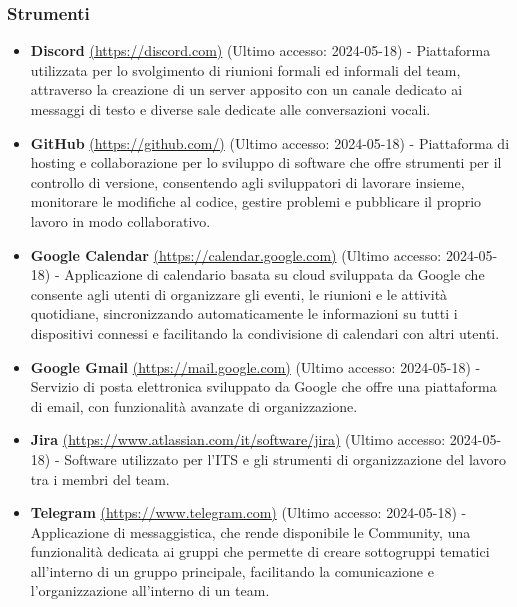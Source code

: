 \subsubsection{Strumenti}
\begin{itemize}
    \item \textbf{Discord} \href{https://discord.com}{(https://discord.com)} (Ultimo accesso: 2024-05-18) - Piattaforma utilizzata per lo svolgimento di riunioni formali ed informali del team, attraverso la creazione di un server apposito con un canale dedicato ai messaggi di testo e diverse sale dedicate alle conversazioni vocali.
    
    \item \textbf{GitHub} \href{https://github.com/}{(https://github.com/)} (Ultimo accesso: 2024-05-18) - Piattaforma di hosting e collaborazione per lo sviluppo di software che offre strumenti per il controllo di versione, consentendo agli sviluppatori di lavorare insieme, monitorare le modifiche al codice, gestire problemi e pubblicare il proprio lavoro in modo collaborativo.
    
    \item \textbf{Google Calendar} \href{https://calendar.google.com}{(https://calendar.google.com)} (Ultimo accesso: 2024-05-18) - Applicazione di calendario basata su cloud sviluppata da Google che consente agli utenti di organizzare gli eventi, le riunioni e le attività quotidiane, sincronizzando automaticamente le informazioni su tutti i dispositivi connessi e facilitando la condivisione di calendari con altri utenti.
    
    \item \textbf{Google Gmail} \href{https://mail.google.com}{(https://mail.google.com)} (Ultimo accesso: 2024-05-18) - Servizio di posta elettronica sviluppato da Google che offre una piattaforma di email, con funzionalità avanzate di organizzazione.
    
    \item \textbf{Jira} \href{https://www.atlassian.com/it/software/jira}{(https://www.atlassian.com/it/software/jira)} (Ultimo accesso: 2024-05-18) - Software utilizzato per l'ITS e gli strumenti di organizzazione del lavoro tra i membri del team.
    
    \item \textbf{Telegram} \href{https://www.telegram.com}{(https://www.telegram.com)} (Ultimo accesso: 2024-05-18) - Applicazione di messaggistica, che rende disponibile le Community, una funzionalità dedicata ai gruppi che permette di creare sottogruppi tematici all'interno di un gruppo principale, facilitando la comunicazione e l'organizzazione all'interno di un team.
    

\end{itemize}
